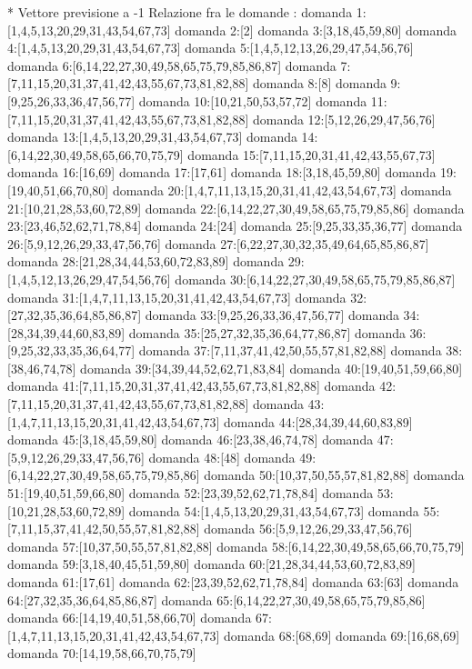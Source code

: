 * Vettore previsione a -1
Relazione fra le domande :
domanda 1:[1,4,5,13,20,29,31,43,54,67,73]
domanda 2:[2]
domanda 3:[3,18,45,59,80]
domanda 4:[1,4,5,13,20,29,31,43,54,67,73]
domanda 5:[1,4,5,12,13,26,29,47,54,56,76]
domanda 6:[6,14,22,27,30,49,58,65,75,79,85,86,87]
domanda 7:[7,11,15,20,31,37,41,42,43,55,67,73,81,82,88]
domanda 8:[8]
domanda 9:[9,25,26,33,36,47,56,77]
domanda 10:[10,21,50,53,57,72]
domanda 11:[7,11,15,20,31,37,41,42,43,55,67,73,81,82,88]
domanda 12:[5,12,26,29,47,56,76]
domanda 13:[1,4,5,13,20,29,31,43,54,67,73]
domanda 14:[6,14,22,30,49,58,65,66,70,75,79]
domanda 15:[7,11,15,20,31,41,42,43,55,67,73]
domanda 16:[16,69]
domanda 17:[17,61]
domanda 18:[3,18,45,59,80]
domanda 19:[19,40,51,66,70,80]
domanda 20:[1,4,7,11,13,15,20,31,41,42,43,54,67,73]
domanda 21:[10,21,28,53,60,72,89]
domanda 22:[6,14,22,27,30,49,58,65,75,79,85,86]
domanda 23:[23,46,52,62,71,78,84]
domanda 24:[24]
domanda 25:[9,25,33,35,36,77]
domanda 26:[5,9,12,26,29,33,47,56,76]
domanda 27:[6,22,27,30,32,35,49,64,65,85,86,87]
domanda 28:[21,28,34,44,53,60,72,83,89]
domanda 29:[1,4,5,12,13,26,29,47,54,56,76]
domanda 30:[6,14,22,27,30,49,58,65,75,79,85,86,87]
domanda 31:[1,4,7,11,13,15,20,31,41,42,43,54,67,73]
domanda 32:[27,32,35,36,64,85,86,87]
domanda 33:[9,25,26,33,36,47,56,77]
domanda 34:[28,34,39,44,60,83,89]
domanda 35:[25,27,32,35,36,64,77,86,87]
domanda 36:[9,25,32,33,35,36,64,77]
domanda 37:[7,11,37,41,42,50,55,57,81,82,88]
domanda 38:[38,46,74,78]
domanda 39:[34,39,44,52,62,71,83,84]
domanda 40:[19,40,51,59,66,80]
domanda 41:[7,11,15,20,31,37,41,42,43,55,67,73,81,82,88]
domanda 42:[7,11,15,20,31,37,41,42,43,55,67,73,81,82,88]
domanda 43:[1,4,7,11,13,15,20,31,41,42,43,54,67,73]
domanda 44:[28,34,39,44,60,83,89]
domanda 45:[3,18,45,59,80]
domanda 46:[23,38,46,74,78]
domanda 47:[5,9,12,26,29,33,47,56,76]
domanda 48:[48]
domanda 49:[6,14,22,27,30,49,58,65,75,79,85,86]
domanda 50:[10,37,50,55,57,81,82,88]
domanda 51:[19,40,51,59,66,80]
domanda 52:[23,39,52,62,71,78,84]
domanda 53:[10,21,28,53,60,72,89]
domanda 54:[1,4,5,13,20,29,31,43,54,67,73]
domanda 55:[7,11,15,37,41,42,50,55,57,81,82,88]
domanda 56:[5,9,12,26,29,33,47,56,76]
domanda 57:[10,37,50,55,57,81,82,88]
domanda 58:[6,14,22,30,49,58,65,66,70,75,79]
domanda 59:[3,18,40,45,51,59,80]
domanda 60:[21,28,34,44,53,60,72,83,89]
domanda 61:[17,61]
domanda 62:[23,39,52,62,71,78,84]
domanda 63:[63]
domanda 64:[27,32,35,36,64,85,86,87]
domanda 65:[6,14,22,27,30,49,58,65,75,79,85,86]
domanda 66:[14,19,40,51,58,66,70]
domanda 67:[1,4,7,11,13,15,20,31,41,42,43,54,67,73]
domanda 68:[68,69]
domanda 69:[16,68,69]
domanda 70:[14,19,58,66,70,75,79]
